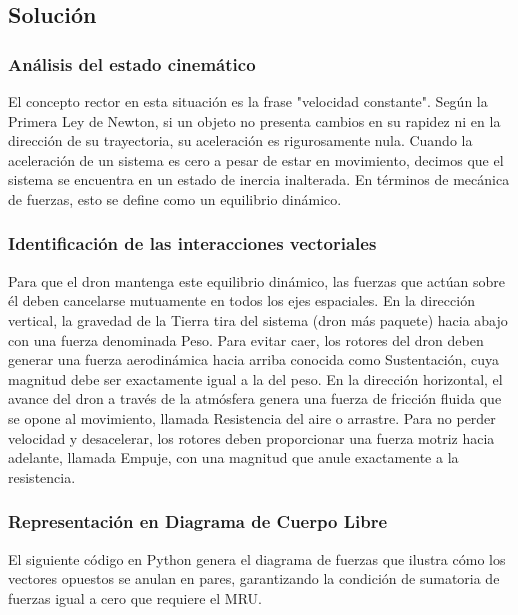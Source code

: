 \documentclass[12pt, a4paper]{article}
\begin{document}
\subsection*{Solución}

\subsubsection*{Análisis del estado cinemático}
El concepto rector en esta situación es la frase "velocidad constante". Según la Primera Ley de Newton, si un objeto no presenta cambios en su rapidez ni en la dirección de su trayectoria, su aceleración es rigurosamente nula. Cuando la aceleración de un sistema es cero a pesar de estar en movimiento, decimos que el sistema se encuentra en un estado de inercia inalterada. En términos de mecánica de fuerzas, esto se define como un equilibrio dinámico.

\subsubsection*{Identificación de las interacciones vectoriales}
Para que el dron mantenga este equilibrio dinámico, las fuerzas que actúan sobre él deben cancelarse mutuamente en todos los ejes espaciales. 
En la dirección vertical, la gravedad de la Tierra tira del sistema (dron más paquete) hacia abajo con una fuerza denominada Peso. Para evitar caer, los rotores del dron deben generar una fuerza aerodinámica hacia arriba conocida como Sustentación, cuya magnitud debe ser exactamente igual a la del peso.
En la dirección horizontal, el avance del dron a través de la atmósfera genera una fuerza de fricción fluida que se opone al movimiento, llamada Resistencia del aire o arrastre. Para no perder velocidad y desacelerar, los rotores deben proporcionar una fuerza motriz hacia adelante, llamada Empuje, con una magnitud que anule exactamente a la resistencia.

\subsubsection*{Representación en Diagrama de Cuerpo Libre}
El siguiente código en Python genera el diagrama de fuerzas que ilustra cómo los vectores opuestos se anulan en pares, garantizando la condición de sumatoria de fuerzas igual a cero que requiere el MRU.
\end{document}
